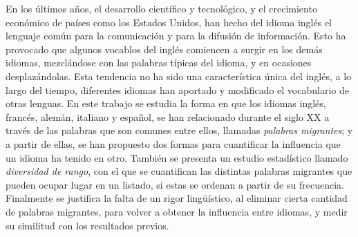 
\begin{abstracts}        

En los últimos años, el desarrollo científico y tecnológico,  y el crecimiento económico de países como los Estados Unidos,  han hecho del idioma inglés el lenguaje común para la comunicación y para la difusión de información. Esto ha provocado que algunos vocablos del inglés comiencen a surgir en los demás idiomas,  mezclándose con las palabras típicas del idioma, y en ocasiones desplazándolas. Esta tendencia no ha sido una característica única del inglés, a lo largo del tiempo, diferentes idiomas han aportado y modificado el vocabulario de otras lenguas. En este trabajo se estudia la forma en que los idiomas inglés, francés, alemán, italiano y español, se han relacionado durante el siglo XX a través de las palabras que son comunes entre ellos, llamadas  \textit{palabras migrantes};  y a partir de ellas, se han propuesto dos formas para cuantificar la influencia que un idioma ha tenido en otro. También se presenta un estudio estadístico llamado \textit{diversidad de rango}, con el que se cuantifican las distintas palabras migrantes que pueden ocupar lugar en un listado, si estas se ordenan  a partir de su frecuencia. Finalmente se justifica la falta de un rigor lingüístico, al eliminar cierta cantidad de palabras migrantes, para volver a obtener la influencia entre idiomas, y medir su similitud con los resultados previos. 



 
\end{abstracts}


